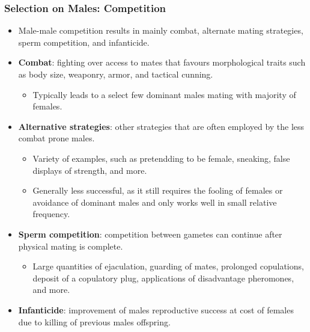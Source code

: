 \documentclass[12pt,a4paper]{article}
\begin{document}
\begin{itemize}
    \subsubsection{Selection on Males: Competition}
    \begin{itemize}
        \item Male-male competition results in mainly combat, alternate mating strategies, sperm competition, and infanticide.
        \item \textbf{Combat}: fighting over access to mates that favours morphological traits such as body size, weaponry, armor, and tactical cunning.
            \begin{itemize}
                \item Typically leads to a select few dominant males mating with majority of females.
            \end{itemize}
        \item \textbf{Alternative strategies}: other strategies that are often employed by the less combat prone males.
            \begin{itemize}
                \item Variety of examples, such as pretendding to be female, sneaking, false displays of strength, and more.
                \item Generally less successful, as it still requires the fooling of females or avoidance of dominant males and only works well in small relative frequency.
            \end{itemize}
        \item \textbf{Sperm competition}: competition between gametes can continue after physical mating is complete.
            \begin{itemize}
                \item Large quantities of ejaculation, guarding of mates, prolonged copulations, deposit of a copulatory plug, applications of disadvantage pheromones, and more.
            \end{itemize}
        \item \textbf{Infanticide}: improvement of males reproductive success at cost of females due to killing of previous males offspring.
    \end{itemize}

\end{itemize}
\end{document}
